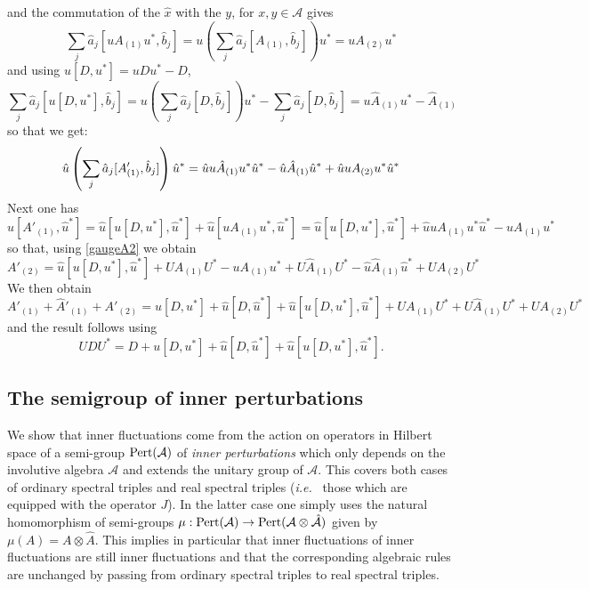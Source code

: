 \documentclass[preprint]{revtex4}
\begin{document}
and the commutation of the $\hat x$ with the $y$, for $x,y\in {\mathcal{A}}$ gives
\begin{equation*}
   \sum_j \hat a_j [ uA_{(1)}u^*, \hat b_j ]=u\left(\sum_j \hat a_j [ A_{(1)}, \hat b_j ]\right)u^*=u A_{(2)}u^*
\end{equation*}
and using $u[D,u^*]=uDu^*-D$,
\begin{equation*}
 \sum_j \hat a_j [u[D,u^*], \hat b_j ]=u\left(\sum_j \hat a_j [D, \hat b_j ]    \right)u^*-\sum_j \hat a_j [D, \hat b_j ]=u\hat A_{(1)}u^*- \hat A_{(1)}
\end{equation*}
so that we get:
\begin{equation}\label{gauge2}
    \hat u\left(\sum_j \hat a_j [ A'_{(1)}, \hat b_j ]\right)\hat u^*=
 \hat u   u \hat A_{(1)}u^*\hat u^*
 -\hat u\hat A_{(1)}\hat u^*\\+
  \hat u   u A_{(2)}u^*\hat u^*
\end{equation}
Next one has
\begin{equation*}
    \hat u [A'_{(1)}, \hat u^*]=\hat u [u[D,u^*], \hat u^*]
    + \hat u [uA_{(1)}u^*, \hat u^*]=\hat u [u[D,u^*], \hat u^*]
    + \hat u   u  A_{(1)}u^*\hat u^*-uA_{(1)}u^*
\end{equation*}
so that, using \eqref{gaugeA2} we obtain
\begin{equation}\label{gaugeA2new}
    A'_{(2)}=\hat u [u[D,u^*], \hat u^*]
    + U  A_{(1)}U^*-uA_{(1)}u^*+U \hat A_{(1)}U^*
 -\hat u\hat A_{(1)}\hat u^*+
  U A_{(2)}U^*
\end{equation}
We then obtain
\begin{equation*}
    A'_{(1)}+\hat A'_{(1)}+ A'_{(2)}=u[D,u^*]+\hat u[D,\hat  u^*]+\hat u [u[D,u^*], \hat u^*]+ U  A_{(1)}U^*+U \hat A_{(1)}U^*
+  U A_{(2)}U^*
\end{equation*}
and the result follows using
\begin{equation*}
 UDU^*=   D+u[D,u^*]+\hat u[D,\hat  u^*]+\hat u [u[D,u^*], \hat u^*].
\end{equation*}
\endproof

\subsection{The semigroup of inner perturbations}\label{sectsemigroup}
We show that inner fluctuations come from the action on operators in Hilbert space of a semi-group ${{\rm Pert}}({\mathcal{A}})$ of {\em inner perturbations} which only depends on the involutive algebra ${\mathcal{A}}$ and extends the unitary group of ${\mathcal{A}}$. This covers both cases of ordinary spectral triples and real spectral triples ({{\it i.e.\/}\ } those which are equipped with the operator $J$). In the latter case one simply uses the natural homomorphism of semi-groups $\mu:{{\rm Pert}}({\mathcal{A}})\to {{\rm Pert}}({\mathcal{A}}\otimes \hat {\mathcal{A}})$ given by $\mu(A)=A\otimes \hat A$. This implies in particular that inner fluctuations of inner fluctuations are still inner fluctuations and that the corresponding algebraic rules are unchanged by passing from ordinary spectral triples  to real spectral triples.
\end{document}
